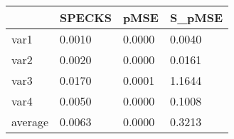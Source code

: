 \begin{tabular}{llll}
  \toprule 
 & SPECKS & pMSE & S\_pMSE \\ 
  \midrule 
var1 & 0.0010 & 0.0000 & 0.0040 \\ 
  var2 & 0.0020 & 0.0000 & 0.0161 \\ 
  var3 & 0.0170 & 0.0001 & 1.1644 \\ 
  var4 & 0.0050 & 0.0000 & 0.1008 \\ 
   \midrule 
average & 0.0063 & 0.0000 & 0.3213 \\ 
   \bottomrule 
\end{tabular}
